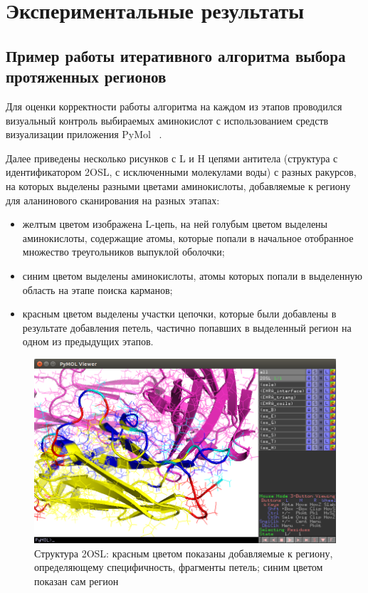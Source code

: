 \graphicspath{{../images/algorithm/}}
\chapter{Экспериментальные результаты}

\section{Пример работы итеративного алгоритма выбора протяженных регионов}
Для оценки корректности работы алгоритма на каждом из этапов проводился визуальный контроль выбираемых аминокислот с использованием средств визуализации приложения PyMol ~\cite{pymol}.

Далее приведены несколько рисунков с L и H цепями антитела (структура с идентификатором 2OSL, с исключенными молекулами воды) с разных ракурсов, на которых выделены разными цветами аминокислоты, добавляемые к региону для аланинового сканирования на разных этапах:
\begin{itemize}

\item желтым цветом изображена L-цепь, на ней голубым цветом выделены аминокислоты, содержащие атомы, которые попали в начальное отобранное множество треугольников выпуклой оболочки;

\item синим цветом выделены аминокислоты, атомы которых попали в выделенную область на этапе поиска карманов;

\item красным цветом выделены участки цепочки, которые были добавлены в результате добавления петель, частично попавших в выделенный регион на одном из предыдущих этапов.
\end{itemize}

\begin{figure}
\includegraphics[width=0.85\linewidth]{loops1.png}

\caption{\small{Структура 2OSL: красным цветом показаны добавляемые к региону, определяющему специфичность, фрагменты петель; синим цветом показан сам регион}}
\label{fig:loops1}
\end{figure}


